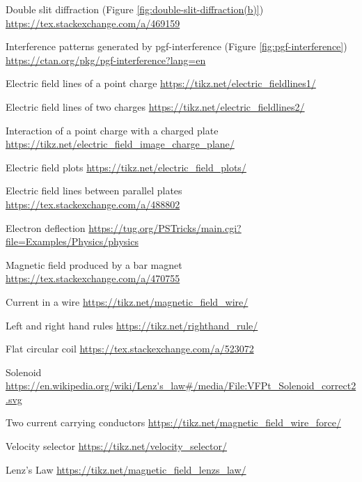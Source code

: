 \documentclass[oneside]{book}
\begin{document}
\begin{enumerate}[label={[\arabic*]}]
    \item\label{source:double-slit-diffraction(b)} Double slit diffraction (Figure \ref{fig:double-slit-diffraction(b)}) \url{https://tex.stackexchange.com/a/469159}
    \item\label{source:pgf-interference} Interference patterns generated by pgf-interference (Figure \ref{fig:pgf-interference}) \url{https://ctan.org/pkg/pgf-interference?lang=en}
    \item\label{Electric field lines of a point charge} Electric field lines of a point charge \url{https://tikz.net/electric_fieldlines1/}
    \item\label{Electric field lines of two charges} Electric field lines of two charges \url{https://tikz.net/electric_fieldlines2/}
    \item\label{Interaction of a point charge with a charged plate} Interaction of a point charge with a charged plate \url{https://tikz.net/electric_field_image_charge_plane/}
    \item\label{Electric field plots} Electric field plots \url{https://tikz.net/electric_field_plots/}
    \item\label{Electric field lines between parallel plates} Electric field lines between parallel plates \url{https://tex.stackexchange.com/a/488802}
    \item\label{Electron deflection} Electron deflection \url{https://tug.org/PSTricks/main.cgi?file=Examples/Physics/physics}
    \item\label{Magnetic field produced by a bar magnet} Magnetic field produced by a bar magnet \url{https://tex.stackexchange.com/a/470755} 
    \item\label{Current in a wire} Current in a wire \url{https://tikz.net/magnetic_field_wire/}
    \item\label{Left and right hand rules} Left and right hand rules \url{https://tikz.net/righthand_rule/}
    \item\label{Flat circular coil} Flat circular coil \url{https://tex.stackexchange.com/a/523072}
    \item\label{Solenoid} Solenoid \url{https://en.wikipedia.org/wiki/Lenz's_law#/media/File:VFPt_Solenoid_correct2.svg}
    \item\label{Two current carrying conductors} Two current carrying conductors \url{https://tikz.net/magnetic_field_wire_force/}
    \item\label{Velocity selector} Velocity selector \url{https://tikz.net/velocity_selector/}
    \item\label{Lenz's Law} Lenz's Law \url{https://tikz.net/magnetic_field_lenzs_law/}

\end{enumerate}
\end{document}

